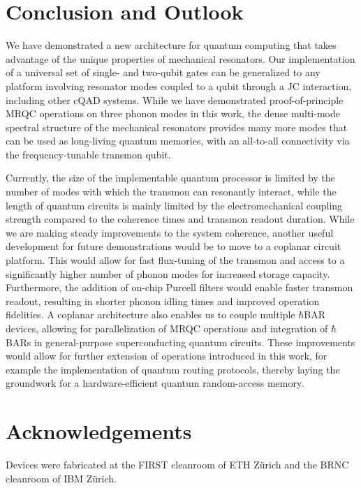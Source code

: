 \documentclass[12pt]{article}
\begin{document}
\section*{Conclusion and Outlook}
We have demonstrated a new architecture for quantum computing that takes advantage of the unique properties of mechanical resonators. Our implementation of a universal set of single- and two-qubit gates can be generalized to any platform involving resonator modes coupled to a qubit through a JC interaction, including other cQAD systems. While we have demonstrated proof-of-principle MRQC operations on three phonon modes in this work, the dense multi-mode spectral structure of the mechanical resonators provides many more modes that can be used as long-living quantum memories, with an all-to-all connectivity via the frequency-tunable transmon qubit.

Currently, the size of the implementable quantum processor is limited by the number of modes with which the transmon can resonantly interact, while the length of quantum circuits is mainly limited by the electromechanical coupling strength compared to the coherence times and transmon readout duration. While we are making steady improvements to the system coherence, another useful development for future demonstrations would be to move to a coplanar circuit platform\cite{kervinen2020sideband}. This would allow for fast flux-tuning of the transmon and access to a significantly higher number of phonon modes for increased storage capacity. Furthermore, the addition of on-chip Purcell filters would enable faster transmon readout, resulting in shorter phonon idling times and improved operation fidelities. A coplanar architecture also enables us to couple multiple $\hbar$BAR devices, allowing for parallelization of MRQC operations and integration of $\hbar$BARs in general-purpose superconducting quantum circuits. These improvements would allow for further extension of operations introduced in this work, for example the implementation of quantum routing protocols\cite{xu2023systems}, thereby laying the groundwork for a hardware-efficient quantum random-access memory\cite{hann2019hardware}.



\newpage





\section*{Acknowledgements} Devices were fabricated at the FIRST cleanroom of ETH Zürich and the BRNC cleanroom of IBM Zürich.
\end{document}
